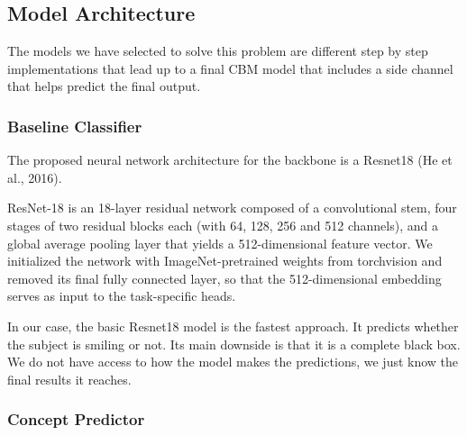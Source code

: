 \documentclass[11pt,a4paper,twocolumn]{article}
\begin{document}
\subsection{Model Architecture}

The models we have selected to solve this problem are different step by step implementations that lead up to a final CBM model that includes a side channel that helps predict the final output.

\subsubsection{Baseline Classifier}

The proposed neural network architecture for the backbone is a Resnet18 (He et al., 2016)\cite{he2015deepresiduallearningimage}. 

ResNet-18 is an 18-layer residual network composed of a convolutional stem, four stages of two residual blocks each (with 64, 128, 256 and 512 channels), and a global average pooling layer that yields a 512-dimensional feature vector. We initialized the network with ImageNet-pretrained weights from torchvision and removed its final fully connected layer, so that the 512-dimensional embedding serves as input to the task-specific heads.



In our case, the basic Resnet18 model is the fastest approach. It predicts whether the subject is smiling or not. Its main downside is that it is a complete black box. We do not have access to how the model makes the predictions, we just know the final results it reaches.

\subsubsection{Concept Predictor}
\end{document}
